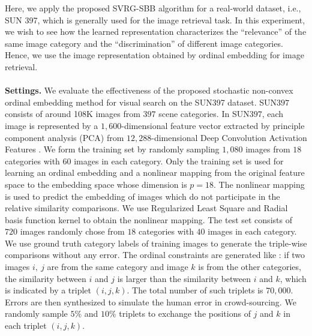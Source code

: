 \documentclass[letterpaper]{article} %
\begin{document}
Here, we apply the proposed SVRG-SBB algorithm for a real-world dataset, i.e., SUN 397, which is generally used for the image retrieval task.
In this experiment, we wish to see how the learned representation characterizes the ``relevance'' of the same image category and the ``discrimination'' of different image categories. Hence, we use the image representation obtained by ordinal embedding for image retrieval.
\\\\
\textbf{Settings. }We evaluate the effectiveness of the proposed stochastic non-convex ordinal embedding method for visual search on the SUN397 dataset. SUN$397$ consists of around 108K images from $397$ scene categories. In SUN$397$, each image is represented by a $1,600$-dimensional feature vector extracted by principle component analysis (PCA) from $12,288$-dimensional Deep Convolution Activation Features \cite{Gong2014}. We form the training set by randomly sampling $1,080$ images from $18$ categories with $60$ images in each category. Only the training set is used for learning an ordinal embedding and a nonlinear mapping from the original feature space to the embedding space whose dimension is $p=18$. The nonlinear mapping is used to predict the embedding of images which do not participate in the relative similarity comparisons. We use Regularized Least Square and Radial basis function kernel to obtain the nonlinear mapping.  The test set consists of $720$ images randomly chose from $18$ categories with $40$ images in each category.  We use ground truth category labels of training images to generate the triple-wise comparisons without any error. The ordinal constraints are generated like \cite{7410580}: if two images $i,\ j$ are from the same category and image $k$ is from the other categories, the similarity between $i$ and $j$ is larger than the similarity between $i$ and $k$, which is indicated by a triplet $(i,j,k)$. The total number of such triplets is $70,000$. Errors are then synthesized to simulate the human error in crowd-sourcing. We randomly sample $5\%$ and $10\%$ triplets to exchange the positions of $j$ and $k$ in each triplet $(i,j,k)$.
\\\\
\end{document}
